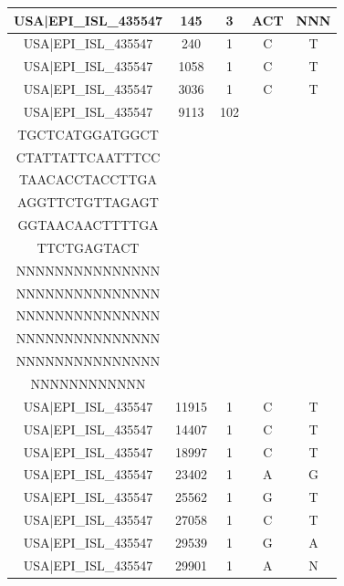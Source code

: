 \documentclass[a4paper,10pt]{article}
\begin{document}
\begin{longtable}{@{}ccccc@{}}
USA|EPI\_ISL\_435547 & 145 & 3 & ACT & NNN \\* \midrule
USA|EPI\_ISL\_435547 & 240 & 1 & C & T \\* \midrule
USA|EPI\_ISL\_435547 & 1058 & 1 & C & T \\* \midrule
USA|EPI\_ISL\_435547 & 3036 & 1 & C & T \\* \midrule
USA|EPI\_ISL\_435547 & 9113 & 102 & \begin{tabular}[c]{@{}c@{}}CTGACACACGTTATG\\ TGCTCATGGATGGCT\\ CTATTATTCAATTTCC\\ TAACACCTACCTTGA\\ AGGTTCTGTTAGAGT\\ GGTAACAACTTTTGA\\ TTCTGAGTACT\end{tabular} & \begin{tabular}[c]{@{}c@{}}NNNNNNNNNNNNNNN\\ NNNNNNNNNNNNNNN\\ NNNNNNNNNNNNNNN\\ NNNNNNNNNNNNNNN\\ NNNNNNNNNNNNNNN\\ NNNNNNNNNNNNNNN\\ NNNNNNNNNNNN\end{tabular} \\* \midrule
USA|EPI\_ISL\_435547 & 11915 & 1 & C & T \\* \midrule
USA|EPI\_ISL\_435547 & 14407 & 1 & C & T \\* \midrule
USA|EPI\_ISL\_435547 & 18997 & 1 & C & T \\* \midrule
USA|EPI\_ISL\_435547 & 23402 & 1 & A & G \\* \midrule
USA|EPI\_ISL\_435547 & 25562 & 1 & G & T \\* \midrule
USA|EPI\_ISL\_435547 & 27058 & 1 & C & T \\* \midrule
USA|EPI\_ISL\_435547 & 29539 & 1 & G & A \\* \midrule
USA|EPI\_ISL\_435547 & 29901 & 1 & A & N \\* \bottomrule
\end{longtable}
\end{document}
